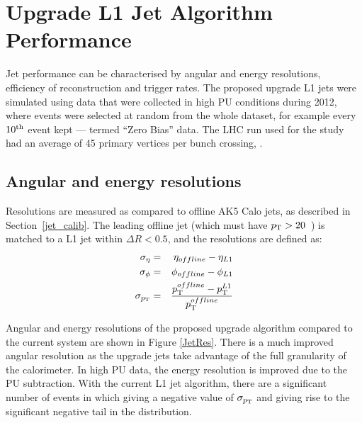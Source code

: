 \section{Upgrade L1 Jet Algorithm Performance}

Jet performance can be characterised by angular and energy resolutions, efficiency of reconstruction and trigger rates. 
The proposed upgrade \ac{L1} jets were simulated using data that were collected in high \ac{PU} conditions during 2012, where events were selected at random from the whole dataset, for example every $10^{\rm th}$ event kept --- termed ``Zero Bias'' data. 
The \ac{LHC} run used for the study had an average of 45 primary vertices per bunch crossing, .  

\subsection{Angular and energy resolutions}

Resolutions are measured as compared to offline AK5 Calo jets, as described in Section~\ref{jet_calib}. 
The leading offline jet (which must have $p_{\text{T}} > 20$~\GeV) is matched to a  \ac{L1} jet within $\Delta R < 0.5$, and the resolutions are defined as:
\begin{eqnarray}
\sigma_{\eta} &=& \eta_{offline} - \eta_{L1} \\
\sigma_{\phi} &=& \phi_{offline} - \phi_{L1}\\
\sigma_{p_{\text{T}}} &=& \frac{ p_{\text{T}}^{offline} - p_{\text{T}}^{L1} } { p_{\text{T}}^{offline} } 
\end{eqnarray}  

Angular and energy resolutions of the proposed upgrade algorithm compared to the current system are shown in Figure \ref{JetRes}.
There is a much improved angular resolution as the upgrade jets take advantage of the full granularity of the calorimeter. 
In high PU data, the energy resolution is improved due to the PU subtraction. 
With the current \ac{L1} jet algorithm, there are a significant number of events in which 
giving a negative value of $\sigma_{p_{\text{T}}}$ and giving rise to the significant negative tail in the distribution.

